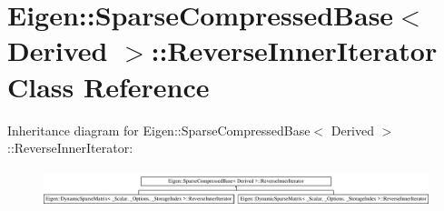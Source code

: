 \hypertarget{class_eigen_1_1_sparse_compressed_base_1_1_reverse_inner_iterator}{}\section{Eigen\+:\+:Sparse\+Compressed\+Base$<$ Derived $>$\+:\+:Reverse\+Inner\+Iterator Class Reference}
\label{class_eigen_1_1_sparse_compressed_base_1_1_reverse_inner_iterator}
Inheritance diagram for Eigen\+:\+:Sparse\+Compressed\+Base$<$ Derived $>$\+:\+:Reverse\+Inner\+Iterator\+:\begin{figure}[H]
\begin{center}
\leavevmode
\includegraphics[height=1.074856cm]{class_eigen_1_1_sparse_compressed_base_1_1_reverse_inner_iterator}
\end{center}
\end{figure}
